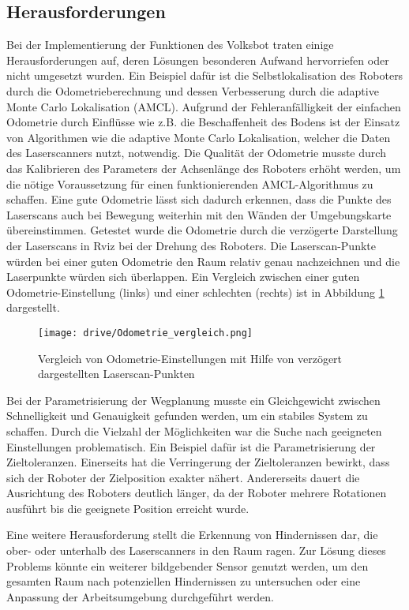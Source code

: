 \subsection{Herausforderungen}

Bei der Implementierung der Funktionen des Volksbot traten einige Herausforderungen auf, deren Lösungen besonderen Aufwand hervorriefen oder nicht umgesetzt wurden. Ein Beispiel dafür ist die Selbstlokalisation des Roboters durch die Odometrieberechnung und dessen Verbesserung durch die adaptive Monte Carlo Lokalisation (AMCL). Aufgrund der Fehleranfälligkeit der einfachen Odometrie durch Einflüsse wie z.B. die Beschaffenheit des Bodens ist der Einsatz von Algorithmen wie die adaptive Monte Carlo Lokalisation, welcher die Daten des Laserscanners nutzt, notwendig.  Die Qualität der Odometrie musste durch das Kalibrieren des Parameters der Achsenlänge des Roboters erhöht werden, um die nötige Voraussetzung für einen funktionierenden AMCL-Algorithmus zu schaffen. Eine gute Odometrie lässt sich dadurch erkennen, dass die Punkte des Laserscans auch bei Bewegung weiterhin mit den Wänden der Umgebungskarte übereinstimmen. Getestet wurde die Odometrie durch die verzögerte Darstellung der Laserscans in Rviz bei der Drehung des Roboters. Die Laserscan-Punkte würden bei einer guten Odometrie den Raum relativ genau nachzeichnen und die Laserpunkte würden sich überlappen. Ein Vergleich zwischen einer guten Odometrie-Einstellung (links) und einer schlechten (rechts) ist in Abbildung \ref{fig:Odo_vergleich} dargestellt.

\begin{figure}[h!]
 \centering
		\texttt{[image: drive/Odometrie\_vergleich.png]}
	\caption{Vergleich von Odometrie-Einstellungen mit Hilfe von verzögert dargestellten Laserscan-Punkten}
	\label{fig:Odo_vergleich}
\end{figure}

Bei der Parametrisierung der Wegplanung musste ein Gleichgewicht zwischen Schnelligkeit und Genauigkeit gefunden werden, um ein stabiles System zu schaffen. Durch die Vielzahl der Möglichkeiten war die Suche nach geeigneten Einstellungen problematisch. Ein Beispiel dafür ist die Parametrisierung der Zieltoleranzen. Einerseits hat die Verringerung der Zieltoleranzen bewirkt, dass sich der Roboter der Zielposition exakter nähert. Andererseits dauert die Ausrichtung des Roboters deutlich länger, da der Roboter mehrere Rotationen ausführt bis die geeignete Position erreicht wurde.

Eine weitere Herausforderung stellt die Erkennung von Hindernissen dar, die ober- oder unterhalb des Laserscanners in den Raum ragen. Zur Lösung dieses Problems könnte ein weiterer bildgebender Sensor genutzt werden, um den gesamten Raum nach potenziellen Hindernissen zu untersuchen oder eine Anpassung der Arbeitsumgebung durchgeführt werden.

